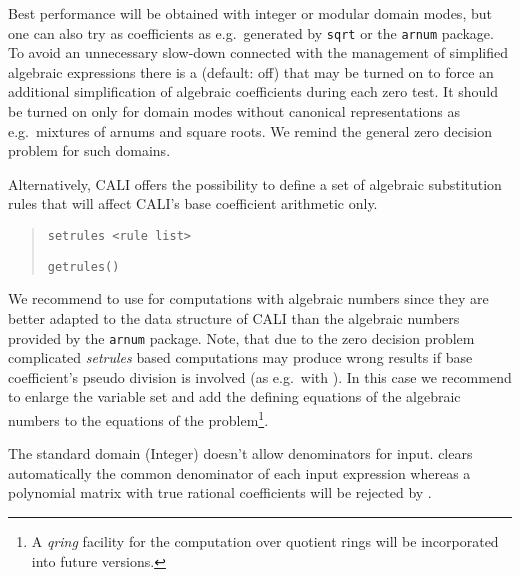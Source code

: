 Best performance will be obtained with integer or modular domain
modes, but one can also try  as coefficients
as e.g.\ generated by \texttt{sqrt} or the \texttt{arnum} package. To avoid
an unnecessary slow-down connected with the management of simplified
algebraic expressions there is a  (default:
off) that may be turned on to force an additional simplification of
algebraic coefficients during each zero test. It should be turned on
only for domain modes without canonical representations as e.g.\
mixtures of arnums and square roots. We remind the general zero
decision problem for such domains. 

Alternatively, CALI offers the possibility to define a set of
algebraic substitution rules that will affect CALI's base coefficient
arithmetic only. 
\begin{quote}
\verb|setrules <rule list>|


\verb|getrules()|

\end{quote}

We recommend to use  for computations with algebraic 
numbers since they are better adapted to the data structure of CALI 
than the algebraic numbers provided by the \texttt{arnum} package. 
Note, that due to the zero decision problem
complicated \emph{setrules} based computations may produce wrong
results if base coefficient's pseudo division is involved (as e.g.\
with ). In this case we recommend to enlarge
the variable set and add the defining equations of the algebraic
numbers to the equations of the problem\footnote{A \emph{qring}
facility for the computation over quotient rings will be incorporated
into future versions.}.
\medskip

The standard domain (Integer) doesn't allow denominators for input.
 clears automatically the common denominator of each
input expression whereas a polynomial matrix with true rational
coefficients will be rejected by \ind{setmodule}.
\medskip

